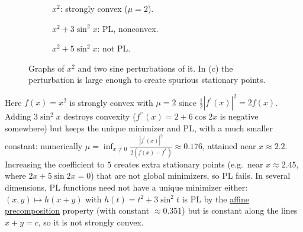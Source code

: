 \begin{example}
		\begin{figure}[H]
		  \centering
		  \begin{subfigure}[t]{0.32\textwidth}
		    \centering
		    \caption{$x^2$: strongly convex ($\mu = 2$).}
		  \end{subfigure}
		  \hfill 
		  \begin{subfigure}[t]{0.32\textwidth}
		    \centering
		    \caption{$x^2 + 3\sin^2 x$: PL, nonconvex.}
		  \end{subfigure}
		  \hfill 
		  \begin{subfigure}[t]{0.32\textwidth}
		    \centering
		    \caption{$x^2 + 5\sin^2 x$: not PL.}
		  \end{subfigure}
		  \caption{Graphs of $x^2$ and two sine perturbations of it. In (c) the perturbation is large enough to create spurious stationary points.}
		  \label{fig:pl-vs-strongly-convex}
		\end{figure}

		Here $f(x) = x^2$ is strongly convex with $\mu = 2$ since $\frac{1}{2}|f^\prime(x)|^2 = 2 f(x)$. Adding $3\sin^2 x$ destroys convexity ($f^{\prime\prime}(x) = 2 + 6\cos 2x$ is negative somewhere) but keeps the unique minimizer and PL, with a much smaller constant: numerically $\mu = \inf_{x \neq 0} \frac{|f^\prime(x)|^2}{2 (f(x) - f^\ast)} \approx 0.176$, attained near $x \approx 2.2$. Increasing the coefficient to $5$ creates extra stationary points (e.g.\ near $x \approx 2.45$, where $2x + 5\sin 2x = 0$) that are not global minimizers, so PL fails. In several dimensions, PL functions need not have a unique minimizer either: $(x, y) \mapsto h(x + y)$ with $h(t) = t^2 + 3\sin^2 t$ is PL by the \hyperref[thm:properties-of-the-pl-inequality]{affine precomposition} property (with constant $\approx 0.351$) but is constant along the lines $x + y = c$, so it is not strongly convex.
	\end{example}

